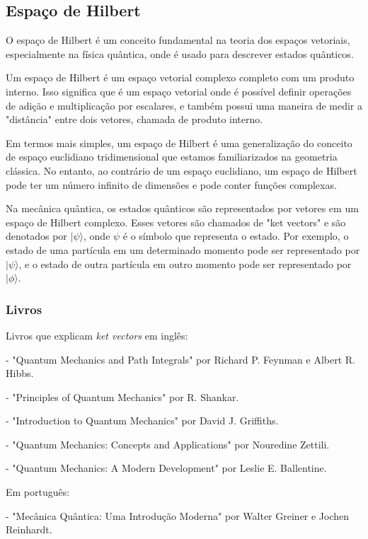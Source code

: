 \documentclass[12pt]{article}
\begin{document}
\subsection{Espaço de Hilbert}


O espaço de Hilbert é um conceito fundamental na teoria dos espaços vetoriais, especialmente na física quântica, onde é usado para descrever estados quânticos.

Um espaço de Hilbert é um espaço vetorial complexo completo com um produto interno. Isso significa que é um espaço vetorial onde é possível definir operações de adição e multiplicação por escalares, e também possui uma maneira de medir a "distância" entre dois vetores, chamada de produto interno.

Em termos mais simples, um espaço de Hilbert é uma generalização do conceito de espaço euclidiano tridimensional que estamos familiarizados na geometria clássica. No entanto, ao contrário de um espaço euclidiano, um espaço de Hilbert pode ter um número infinito de dimensões e pode conter funções complexas.

Na mecânica quântica, os estados quânticos são representados por vetores em um espaço de Hilbert complexo. Esses vetores são chamados de "ket vectors" e são denotados por $|\psi\rangle$, onde $\psi$ é o símbolo que representa o estado. Por exemplo, o estado de uma partícula em um determinado momento pode ser representado por $|\psi\rangle$, e o estado de outra partícula em outro momento pode ser representado por $|\phi\rangle$.

\subsubsection{Livros}

Livros que explicam \textit{ket vectors} em inglês:

- "Quantum Mechanics and Path Integrals" por Richard P. Feynman e Albert R. Hibbs.

- "Principles of Quantum Mechanics" por R. Shankar.

- "Introduction to Quantum Mechanics" por David J. Griffiths.

- "Quantum Mechanics: Concepts and Applications" por Nouredine Zettili.

- "Quantum Mechanics: A Modern Development" por Leslie E. Ballentine.

Em português:

- "Mecânica Quântica: Uma Introdução Moderna" por Walter Greiner e Jochen Reinhardt.
\end{document}
